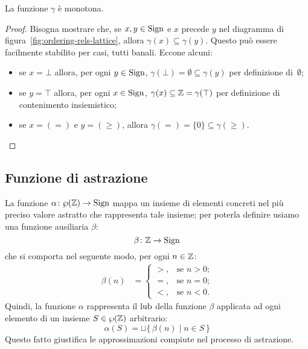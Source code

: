 \begin{proposizione}
La funzione $\gamma$ è monotona.
\end{proposizione}
\begin{proof}
  Bisogna mostrare che, se $x, y \in \mathrm{Sign}$ e $x$ precede $y$ nel diagramma
  di figura~\ref{fig:ordering-rels-lattice}, allora
  $\gamma(x) \subseteq \gamma(y)$.
  Questo può essere facilmente stabilito per casi, tutti banali.
  Eccone alcuni:
  \begin{itemize}
    \item
      se $x = \bot$ allora, per ogni $y \in \mathrm{Sign}$,
      $\gamma(\bot) = \emptyset \subseteq \gamma(y)$
      per definizione di~$\emptyset$;
    \item
      se $y = \top$ allora, per ogni $x \in \mathrm{Sign}$,
      $\gamma(x) \subseteq \mathbb{Z} = \gamma(\top)$
      per definizione di contenimento insiemistico;
    \item
      se $x = (=)$ e $y = (\geq)$, allora
      $\gamma(=) = \{0\} \subseteq \gamma(\geq)$.
  \end{itemize}
\end{proof}

\subsection{Funzione di astrazione}

\begin{definizione} 
La funzione $\mathord{\alpha}\colon\wp(\mathbb{Z})\to\mathrm{Sign}$ mappa un insieme
di elementi concreti nel più preciso valore astratto che rappresenta
tale insieme; per poterla definire usiamo una funzione ausiliaria
$\beta$:
\[
  \mathord{\beta}\colon\mathbb{Z}\to\mathrm{Sign}
\]
che si comporta nel seguente modo, per ogni $n \in \mathbb{Z}$:
\begin{align*}
  \beta(n) &=
    \begin{cases}
      >,      &\text{se $n  >  0$;} \\
      =,      &\text{se $n = 0$;} \\
      <,      &\text{se $n < 0$.}
    \end{cases} 
\end{align*}
Quindi, la funzione $\alpha$ rappresenta il $\mathop{\mathrm{lub}}\nolimits$ della
funzione $\beta$ applicata ad ogni elemento di un insieme
$S \in \wp(\mathbb{Z})$ arbitrario:
\[
  \alpha(S) = \sqcup \{\, \beta(n) \mid n \in S \,\}
\]
Questo fatto giustifica le approssimazioni compiute nel processo
di astrazione.
\end{definizione}

